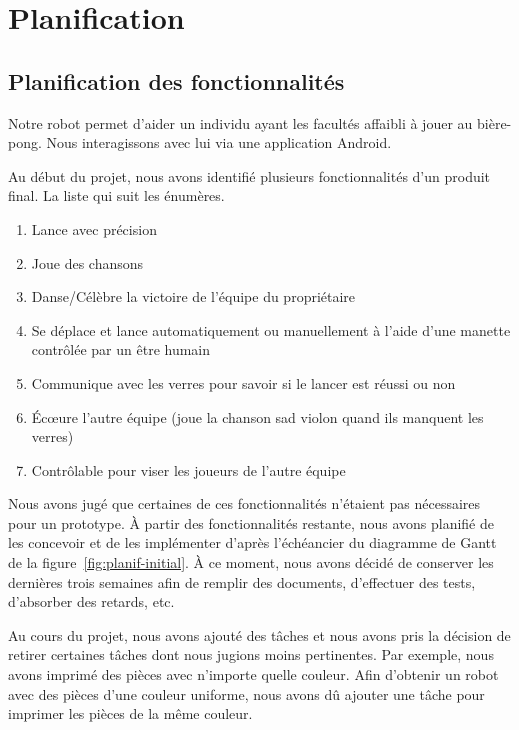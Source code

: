 \section{Planification}

\subsection{Planification des fonctionnalités}

Notre robot permet d'aider un individu ayant les facultés affaibli à jouer au bière-pong.
Nous interagissons avec lui via une application Android.

Au début du projet, nous avons identifié plusieurs fonctionnalités d'un produit final.
La liste qui suit les énumères.

\begin{enumerate}
    \item Lance avec précision
    \item Joue des chansons
    \item Danse/Célèbre la victoire de l’équipe du propriétaire
    \item Se déplace et lance automatiquement ou manuellement à l’aide d’une manette contrôlée par un être humain
    \item Communique avec les verres pour savoir si le lancer est réussi ou non
    \item Écœure l’autre équipe (joue la chanson sad violon quand ils manquent les verres)
    \item Contrôlable pour viser les joueurs de l’autre équipe
\end{enumerate}

Nous avons jugé que certaines de ces fonctionnalités n'étaient pas nécessaires pour un prototype.
À partir des fonctionnalités restante, nous avons planifié de les concevoir et de les implémenter d'après l'échéancier du diagramme de Gantt de la figure~\ref{fig:planif-initial}.
À ce moment, nous avons décidé de conserver les dernières trois semaines afin de remplir des documents, d'effectuer des tests, d'absorber des retards, etc.

Au cours du projet, nous avons ajouté des tâches et nous avons pris la décision de retirer certaines tâches dont nous jugions moins pertinentes.
Par exemple, nous avons imprimé des pièces avec n'importe quelle couleur.
Afin d'obtenir un robot avec des pièces d'une couleur uniforme, nous avons dû ajouter une tâche pour imprimer les pièces de la même couleur.

